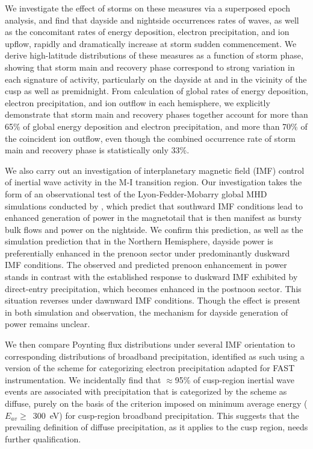 We investigate the effect of storms on these measures via a superposed
epoch analysis, and find that dayside and nightside occurrences rates
of \Alf waves, as well as the concomitant rates of energy deposition,
electron precipitation, and ion upflow, rapidly and dramatically
increase at storm sudden commencement. We derive high-latitude
distributions of these measures as a function of storm phase, showing
that storm main and recovery phase correspond to strong variation in
each signature of \Alfic activity, particularly on the dayside at and
in the vicinity of the cusp as well as premidnight. From calculation
of global rates of \Alfic energy deposition, electron precipitation,
and ion outflow in each hemisphere, we explicitly demonstrate that
storm main and recovery phases together account for more than 65\% of
global \Alfic energy deposition and electron precipitation, and more
than 70\% of the coincident ion outflow, even though the combined
occurrence rate of storm main and recovery phase is statistically only
33\%.

We also carry out an investigation of interplanetary magnetic field
(IMF) control of inertial \Alf wave activity in the M-I transition
region. Our investigation takes the form of an observational test of
the Lyon-Fedder-Mobarry global MHD simulations conducted by
\citet{Zhang2014}, which predict that southward IMF
conditions lead to enhanced generation of power in the magnetotail
that is then manifest as bursty bulk flows and \Alfic power on the
nightside. We confirm this prediction, as well as the simulation
prediction that in the Northern Hemisphere, dayside \Alfic power is
preferentially enhanced in the prenoon sector under predominantly
duskward IMF conditions. The observed and predicted prenoon
enhancement in \Alfic power stands in contrast with the established
response \citep[e.g.,][]{Zhou2000} to duskward IMF exhibited
by direct-entry precipitation, which becomes enhanced in the postnoon
sector. This situation reverses under dawnward IMF conditions. Though
the effect is present in both simulation and observation, the
mechanism for dayside generation of \Alfic power remains unclear. 

We then compare \Alfic Poynting flux distributions under several IMF
orientation to corresponding distributions of broadband precipitation,
identified as such using a version of the \citet{Newell2009}
scheme for categorizing electron precipitation adapted for FAST
instrumentation. We incidentally find that $\approx$95\% of
cusp-region inertial \Alf wave events are associated with
precipitation that is categorized by the \citet{Newell2009}
scheme as diffuse, purely on the basis of the criterion imposed on
minimum average energy ($E_{av} \geq$~300~eV) for cusp-region broadband
precipitation. This suggests that the prevailing definition of diffuse
precipitation, as it applies to the cusp region, needs further
qualification. 

